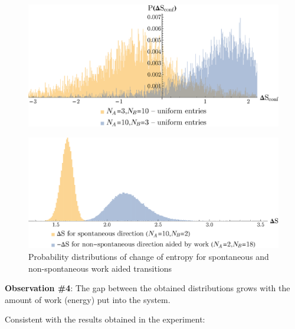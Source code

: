 \documentclass[a0]{sciposter}
\begin{document}
\begin{multicols}{3}
\begin{flushleft}
\begin{minipage}[b]{22.0cm}
\centering
\begin{figure}[ht!]
\includegraphics[width=22cm]{Figure6.eps} 
\end{figure}
\end{minipage}
\begin{minipage}[b]{23.0cm}
\centering
\begin{figure}[ht!]
\includegraphics[width=23cm]{Figure7.eps} \caption{Probability distributions of change of entropy for spontaneous and non-spontaneous work aided transitions}
\label{Fig4} 
\end{figure}
\end{minipage}
\vspace{-1.0cm} 
\begin{tcolorbox}[colframe=green!500!white,colback=white!50!white,boxrule=3pt]
\textbf{Observation \#4}: The gap between the obtained distributions grows with the amount of work (energy) put into the system.
\end{tcolorbox}

Consistent with the results obtained in the experiment:


\end{flushleft}
\end{multicols}
\end{document}
